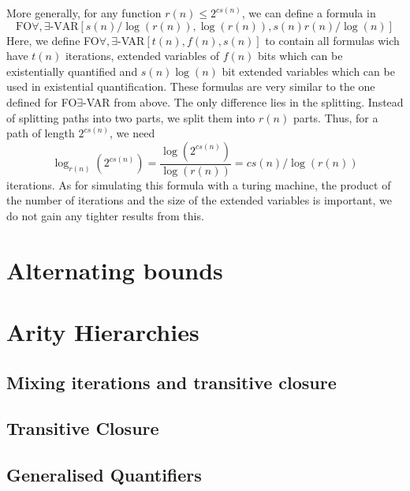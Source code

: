 More generally, for any function $r(n) \leq 2^{cs(n)}$, we can define a formula in \[\text{FO$\forall, \exists$-VAR$[s(n)/\log(r(n)), \log(r(n)), s(n)r(n)/\log(n)]$}\]
Here, we define FO$\forall, \exists$-VAR$[t(n), f(n), s(n)]$ to contain all formulas wich have $t(n)$ iterations, extended variables of $f(n)$ bits which can be existentially quantified and $s(n)\log(n)$ bit extended variables which can be used in existential quantification.
These formulas are very similar to the one defined for FO$\exists$-VAR from above.
The only difference lies in the splitting.
Instead of splitting paths into two parts, we split them into $r(n)$ parts.
Thus, for a path of length $2^{cs(n)}$, we need \[\log_{r(n)}\left(2^{cs(n)}\right) = \frac{\log\left(2^{cs(n)}\right)}{\log(r(n))} = cs(n)/\log(r(n))\] iterations.
As for simulating this formula with a turing machine, the product of the number of iterations and the size of the extended variables is important, we do not gain any tighter results from this.

\section{Alternating bounds}\label{sec:alternating-bounds}

\section{Arity Hierarchies}\label{sec:arity-hierarchies}

\subsection{Mixing iterations and transitive closure}\label{subsec:mixing-iterations-and-transitive-closure}

\subsection{Transitive Closure}\label{subsec:transitive-closure}

\subsection{Generalised Quantifiers}\label{subsec:generalised-quantifiers}

